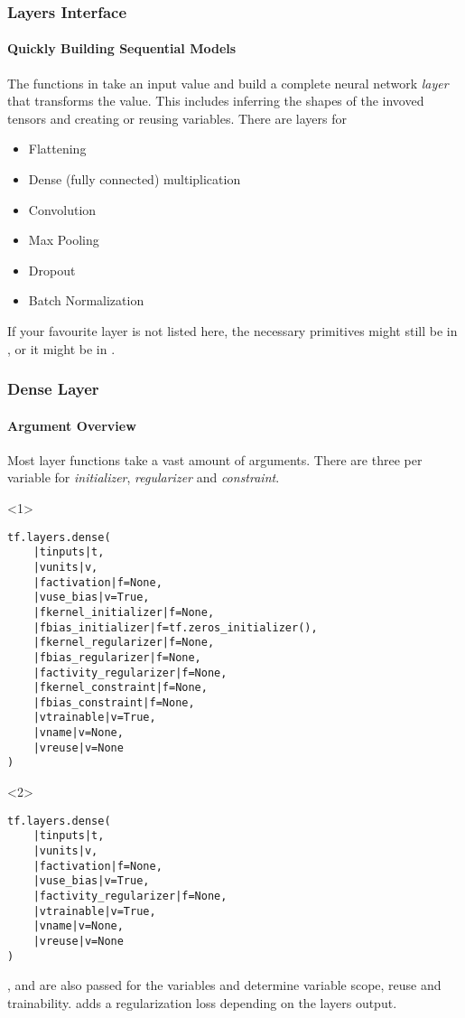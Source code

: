 
\begin{frame}
    \frametitle{Layers Interface}
    \framesubtitle{Quickly Building Sequential Models}
    The functions in  take an input value and build a complete neural network \emph{layer} that transforms the value.
    This includes inferring the shapes of the invoved tensors and creating or reusing variables. 
    There are layers for
    \begin{itemize}
        \item Flattening
        \item Dense (fully connected) multiplication
        \item Convolution
        \item Max Pooling
        \item Dropout
        \item Batch Normalization 
    \end{itemize}
    \pause
    If your favourite layer is not listed here, the necessary primitives might still be in , or it might be in .
\end{frame}

\begin{frame}[fragile]
    \frametitle{Dense Layer}
    \framesubtitle{Argument Overview}
    Most layer functions take a vast amount of arguments. There are three per variable for \emph{initializer}, \emph{regularizer} and \emph{constraint}.
    \begin{onlyenv}<1>
    \begin{lstlisting}
tf.layers.dense(
    |tinputs|t,
    |vunits|v,
    |factivation|f=None,
    |vuse_bias|v=True,
    |fkernel_initializer|f=None,
    |fbias_initializer|f=tf.zeros_initializer(),
    |fkernel_regularizer|f=None,
    |fbias_regularizer|f=None,
    |factivity_regularizer|f=None,
    |fkernel_constraint|f=None,
    |fbias_constraint|f=None,
    |vtrainable|v=True,
    |vname|v=None,
    |vreuse|v=None
)
    \end{lstlisting}
    \end{onlyenv}
    \begin{onlyenv}<2>
    \begin{lstlisting}
tf.layers.dense(
    |tinputs|t,
    |vunits|v,
    |factivation|f=None,
    |vuse_bias|v=True,
    |factivity_regularizer|f=None,
    |vtrainable|v=True,
    |vname|v=None,
    |vreuse|v=None
)
    \end{lstlisting}
    ,  and  are also passed for the variables and determine variable scope, reuse and trainability.  adds 
    a regularization loss depending on the layers output. 
    \end{onlyenv}
\end{frame}

